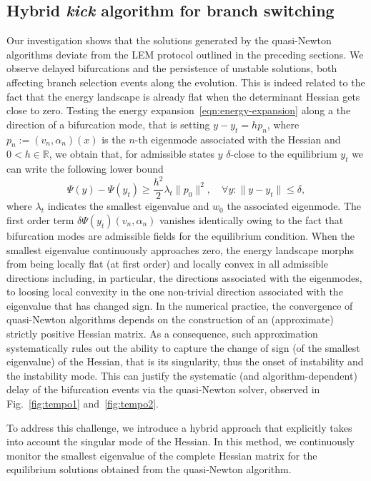 \documentclass[10pt]{article}
\begin{document}
\subsection{Hybrid \emph{kick} algorithm  for branch switching}
Our investigation shows that the solutions generated by the quasi-Newton algorithms deviate from the LEM protocol outlined in the preceding sections. We observe delayed bifurcations and the persistence of unstable solutions, {both affecting} branch selection events along the evolution.  This is indeed related to the fact that the energy landscape is already flat when the determinant Hessian gets close to zero. 
    Testing the energy expansion~\eqref{eqn:energy-expansion} 
    along a the direction of a bifurcation mode, that is setting $y-y_t=h p_n$, where $p_n:=(v_n, \alpha_n)(x)$ is the $n$-th eigenmode associated with  the Hessian and $0<h\in \mathbb R$, we obtain that, for admissible states $y$ $\delta$-close to the equilibrium $y_t$ we can write the following lower bound
$$
\Psi(y)-\Psi(y_t)\geq \frac{h^2}{2}\lambda_t \|p_0\|^2, \quad \forall y: \|y - y_t\| \leq \delta,
%
%
$$
%
    where $\lambda_t$ indicates the smallest eigenvalue and $w_0$ the associated eigenmode. The first order term $\delta\Psi(y_t)(v_n, \alpha_n)$ vanishes identically owing to the fact that bifurcation modes are admissible fields for the equilibrium condition. 
When the smallest eigenvalue continuously approaches zero, the energy landscape morphs from being locally flat (at first order) and locally convex in all admissible directions including, in particular, the directions associated with  the eigenmodes, to loosing local convexity in the one non-trivial direction associated with  the eigenvalue that has changed sign. 
In the numerical practice, 
the convergence of quasi-Newton algorithms depends on the construction of an (approximate) strictly positive Hessian matrix.
As a consequence, such approximation systematically rules out the ability to capture the change of sign (of the smallest eigenvalue) of the Hessian, that is its singularity, thus the onset of instability and the instability mode. 
This can justify the systematic (and algorithm-dependent) delay of the bifurcation events via the quasi-Newton solver, observed in Fig.~\ref{fig:tempo1} and~\ref{fig:tempo2}.

To address this challenge, we introduce a hybrid approach {that explicitly takes into account the singular mode of the Hessian}. In this method, we continuously monitor the smallest eigenvalue of the complete {Hessian} matrix for the equilibrium solutions obtained from the quasi-Newton algorithm.
%
\end{document}
